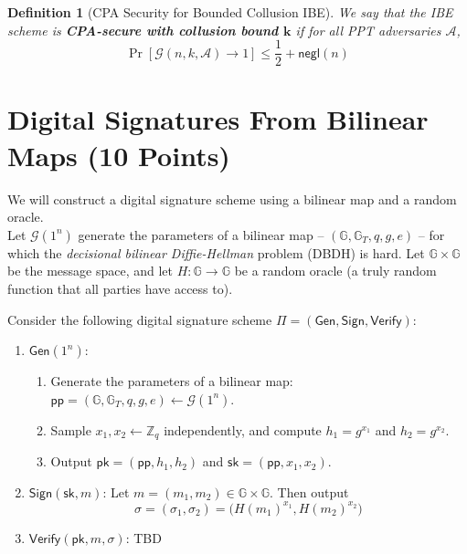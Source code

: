 \documentclass[11pt]{article}
\newtheorem{definition}[theorem]{Definition}
\numberwithin{equation}{section}
\newcommand{\gen}{\mathsf{Gen}}
\newcommand{\sign}{\mathsf{Sign}}
\newcommand{\verify}{\mathsf{Verify}}
\newcommand{\pk}{\mathsf{pk}}
\newcommand{\sk}{\mathsf{sk}}
\newcommand{\params}{\mathsf{pp}}
\newcommand{\A}{\mathcal{A}}
\newcommand{\G}{\mathcal{G}}
\newcommand{\negl}{\mathsf{negl}}
\newcommand{\GG}{\mathbb{G}}
\newcommand{\ZZ}{\mathbb{Z}}
\begin{document}
\begin{definition}[CPA Security for Bounded Collusion IBE]
    We say that the IBE scheme is \textbf{CPA-secure with collusion bound $\mathbf{k}$} if for all PPT adversaries $\A$, 
    \[\Pr[\G(n, k, \A) \to 1] \leq \frac{1}{2} + \negl(n)\]
\end{definition}
\pagebreak


\section{Digital Signatures From Bilinear Maps (10 Points)}
We will construct a digital signature scheme using a bilinear map and a random oracle.\\

Let $\G(1^n)$ generate the parameters of a bilinear map -- $(\GG, \GG_T, q, g, e)$ -- for which the \textit{decisional bilinear Diffie-Hellman} problem (DBDH) is hard.
Let $\GG \times \GG$ be the message space, and let $H: \GG \to \GG$ be a random oracle (a truly random function that all parties have access to).

Consider the following digital signature scheme $\Pi = (\gen, \sign, \verify)$:
\begin{enumerate}
\item $\gen(1^n)$: 
\begin{enumerate}
    \item Generate the parameters of a bilinear map: $\params = (\GG, \GG_T, q, g, e) \leftarrow \G(1^n)$.
    \item Sample $x_1, x_2 \leftarrow \ZZ_q$ independently, and compute $h_1 = g^{x_1}$ and $h_2 = g^{x_2}$.
    \item Output $\pk=(\params, h_1, h_2)$ and $\sk = (\params, x_1, x_2)$.
\end{enumerate}

\item $\sign(\sk, m)$: Let $m = (m_1, m_2) \in \GG \times \GG$. Then output 
\[\sigma = (\sigma_1, \sigma_2) = \big(H(m_1)^{x_1}, H(m_2)^{x_2}\big)\]
\item $\verify(\pk, m, \sigma)$: TBD
\end{enumerate}
\end{document}
